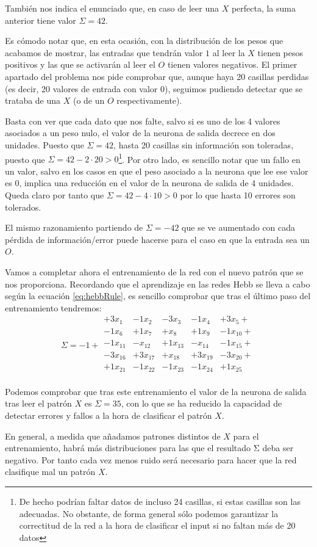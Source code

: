 \begin{problem}[3]
También nos indica el enunciado que, en caso de leer una $X$ perfecta, la suma anterior tiene valor $Σ=42$.

Es cómodo notar que, en esta ocasión, con la distribución de los pesos que acabamos de mostrar, las entradas que tendrán valor $1$ al leer la $X$ tienen pesos positivos y las que se activarán al leer el $O$ tienen valores negativos.
\spart
El primer apartado del problema nos pide comprobar que, aunque haya 20 casillas perdidas (es decir, 20 valores de entrada con valor 0), seguimos pudiendo detectar que se trataba de una $X$ (o de un $O$ respectivamente).

Basta con ver que cada dato que nos falte, salvo si es uno de los 4 valores asociados a un peso nulo, el valor de la neurona de salida decrece en dos unidades. Puesto que $Σ=42$, hasta 20 casillas sin información son toleradas, puesto que $Σ=42-2\cdot 20 > 0$\footnote{De hecho podrían faltar datos de incluso 24 casillas, si estas casillas son las adecuadas. No obstante, de forma general sólo podemos garantizar la correctitud de la red a la hora de clasificar el input si no faltan más de 20 datos}.
\spart
Por otro lado, es sencillo notar que un fallo en un valor, salvo en los casos en que el peso asociado a la neurona que lee ese valor es 0, implica una reducción en el valor de la neurona de salida de 4 unidades. Queda claro por tanto que $Σ=42-4\cdot 10>0$ por lo que hasta 10 errores son tolerados.

El mismo razonamiento partiendo de $Σ=-42$ que se ve aumentado con cada pérdida de información/error puede hacerse para el caso en que la entrada sea un $O$.

\spart
Vamos a completar ahora el entrenamiento de la red con el nuevo patrón que se nos proporciona. Recordando que el aprendizaje en las redes Hebb se lleva a cabo según la ecuación \ref{eq:hebbRule}, es sencillo comprobar que tras el último paso del entrenamiento tendremos:
\[Σ = -1 + \begin{array}{ccccc}
+3x_1& -1x_2 & -3x_3 & -1x_4 & +3x_5 +\\
-1x_6 & + 1x_7 & +x_8 & + 1x_9 &- 1x_{10} +\\
-1x_{11} & -x_{12} & +1x_{13} & -x_{14} & -1x_{15} + \\
-3x_{16} & +3x_{17} & +x_{18} & +3x_{19} & -3x_{20} + \\
+1x_{21} & -1x_{22} & -1x_{23} & -1x_{24} & +1x_{25} \\
\end{array}\]

Podemos comprobar que tras este entrenamiento el valor de la neurona de salida tras leer el patrón $X$ es $Σ=35$, con lo que se ha reducido la capacidad de detectar errores y fallos a la hora de clasificar el patrón $X$.

En general, a medida que añadamos patrones distintos de $X$ para el entrenamiento, habrá más distribuciones para las que el resultado Σ deba ser negativo. Por tanto cada vez menos ruido será necesario para hacer que la red clasifique mal un patrón $X$.
\end{problem}

